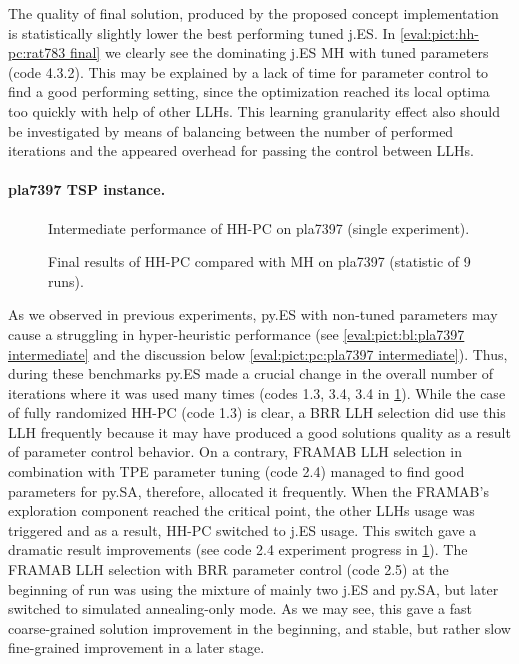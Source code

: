 The quality of final solution, produced by the proposed concept implementation is statistically slightly lower the best performing tuned j.ES. In \cref{eval:pict:hh-pc:rat783 final} we clearly see the dominating j.ES MH with tuned parameters (code 4.3.2). This may be explained by a lack of time for parameter control to find a good performing setting, since the optimization reached its local optima too quickly with help of other LLHs. This learning granularity effect also should be investigated by means of balancing between the number of performed iterations and the appeared overhead for passing the control between LLHs.


\paragraph{pla7397 TSP instance.}
\begin{figure}[t]
	\centering
	\vspace{-20pt}
	
	\caption{Intermediate performance of HH-PC on pla7397 (single experiment).}
	\vspace{-5pt}
	\label{eval:pict:hh-pc:pla7397 intermediate}
\end{figure}

\begin{figure}[t]
	\centering
	\vspace{-20pt}
	
	\caption{Final results of HH-PC compared with MH on pla7397 (statistic of 9 runs).}
	\vspace{-5pt}
	\label{eval:pict:hh-pc:pla7397 final}
\end{figure}

As we observed in previous experiments, py.ES with non-tuned parameters may cause a struggling in hyper-heuristic performance (see \cref{eval:pict:bl:pla7397 intermediate} and the discussion below \cref{eval:pict:pc:pla7397 intermediate}). Thus, during these benchmarks py.ES made a crucial change in the overall number of iterations where it was used many times (codes 1.3, 3.4, 3.4 in \cref{eval:pict:hh-pc:pla7397 intermediate}). While the case of fully randomized HH-PC (code 1.3) is clear, a BRR LLH selection did use this LLH frequently because it may have produced a good solutions quality as a result of parameter control behavior. On a contrary, FRAMAB LLH selection in combination with TPE parameter tuning (code 2.4) managed to find good parameters for py.SA, therefore, allocated it frequently. When the FRAMAB's exploration component reached the critical point, the other LLHs usage was triggered and as a result, HH-PC switched to j.ES usage. This switch gave a dramatic result improvements (see code 2.4 experiment progress in \cref{eval:pict:hh-pc:pla7397 intermediate}). The FRAMAB LLH selection with BRR parameter control (code 2.5) at the beginning of run was using the mixture of mainly two j.ES and py.SA, but later switched to simulated annealing-only mode. As we may see, this gave a fast coarse-grained solution improvement in the beginning, and stable, but rather slow fine-grained improvement in a later stage.

